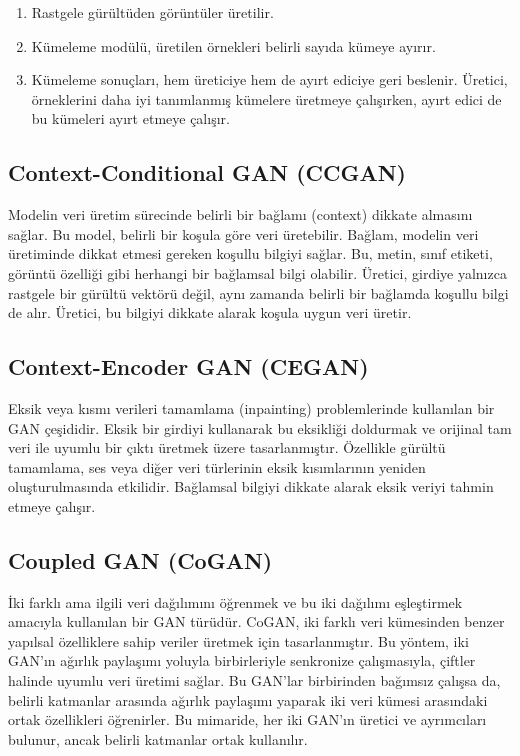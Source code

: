 \begin{enumerate}
    \item Rastgele gürültüden görüntüler üretilir.
    \item Kümeleme modülü, üretilen örnekleri belirli sayıda kümeye ayırır.
    \item Kümeleme sonuçları, hem üreticiye hem de ayırt ediciye geri beslenir. Üretici, örneklerini daha iyi tanımlanmış kümelere üretmeye çalışırken, ayırt edici de bu kümeleri ayırt etmeye çalışır.
\end{enumerate}

\subsection{Context-Conditional GAN (CCGAN)}

Modelin veri üretim sürecinde belirli bir bağlamı (context) dikkate almasını sağlar. Bu model, belirli bir koşula göre veri üretebilir. Bağlam, modelin veri üretiminde dikkat etmesi gereken koşullu bilgiyi sağlar. Bu, metin, sınıf etiketi, görüntü özelliği gibi herhangi bir bağlamsal bilgi olabilir. Üretici, girdiye yalnızca rastgele bir gürültü vektörü değil, aynı zamanda belirli bir bağlamda koşullu bilgi de alır. Üretici, bu bilgiyi dikkate alarak koşula uygun veri üretir. 

\subsection{Context-Encoder GAN (CEGAN)}

Eksik veya kısmı verileri tamamlama (inpainting) problemlerinde kullanılan bir GAN çeşididir. Eksik bir girdiyi kullanarak bu eksikliği doldurmak ve orijinal tam veri ile uyumlu bir çıktı üretmek üzere tasarlanmıştır. Özellikle gürültü tamamlama, ses veya diğer veri türlerinin eksik kısımlarının yeniden oluşturulmasında etkilidir. Bağlamsal bilgiyi dikkate alarak eksik veriyi tahmin etmeye çalışır.

\subsection{Coupled GAN (CoGAN)}

İki farklı ama ilgili veri dağılımını öğrenmek ve bu iki dağılımı eşleştirmek amacıyla kullanılan bir GAN türüdür. CoGAN, iki farklı veri kümesinden benzer yapılsal özelliklere sahip veriler üretmek için tasarlanmıştır. Bu yöntem, iki GAN'ın ağırlık paylaşımı yoluyla birbirleriyle senkronize çalışmasıyla, çiftler halinde uyumlu veri üretimi sağlar. Bu GAN'lar birbirinden bağımsız çalışsa da, belirli katmanlar arasında ağırlık paylaşımı yaparak iki veri kümesi arasındaki ortak özellikleri öğrenirler. Bu mimaride, her iki GAN'ın üretici ve ayrımcıları bulunur, ancak belirli katmanlar ortak kullanılır. 

